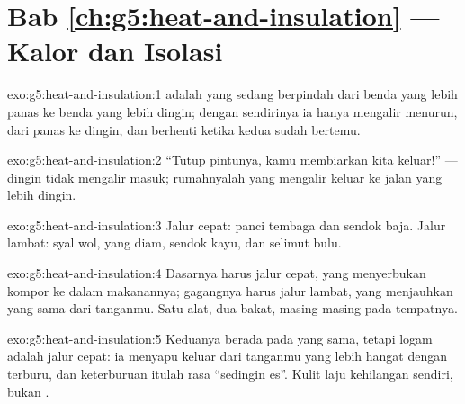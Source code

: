 \section*{Bab \ref{ch:g5:heat-and-insulation} --- Kalor dan Isolasi}

\begin{solution}{exo:g5:heat-and-insulation:1}
 adalah  yang sedang berpindah dari benda yang lebih panas
ke benda yang lebih dingin; dengan sendirinya ia hanya mengalir
menurun, dari panas ke dingin, dan berhenti ketika kedua  sudah
bertemu.
\end{solution}

\begin{solution}{exo:g5:heat-and-insulation:2}
``Tutup pintunya, kamu membiarkan  kita keluar!'' --- dingin
tidak mengalir masuk;  rumahnyalah yang mengalir keluar ke jalan
yang lebih dingin.
\end{solution}

\begin{solution}{exo:g5:heat-and-insulation:3}
Jalur cepat: panci tembaga dan sendok baja. Jalur lambat: syal wol,
 yang diam, sendok kayu, dan selimut bulu.
\end{solution}

\begin{solution}{exo:g5:heat-and-insulation:4}
Dasarnya harus jalur cepat, yang menyerbukan  kompor ke dalam
makanannya; gagangnya harus jalur lambat, yang menjauhkan  yang
sama dari tanganmu. Satu alat, dua bakat, masing-masing pada
tempatnya.
\end{solution}

\begin{solution}{exo:g5:heat-and-insulation:5}
Keduanya berada pada  yang sama, tetapi logam adalah jalur cepat:
ia menyapu  keluar dari tanganmu yang lebih hangat dengan
terburu, dan keterburuan itulah rasa ``sedingin es''. Kulit 
laju kehilangan  sendiri, bukan .
\end{solution}

